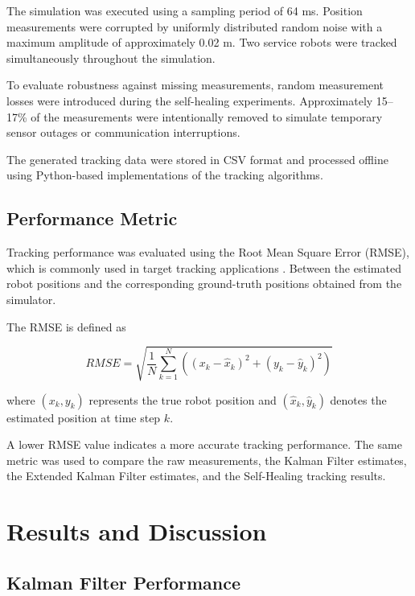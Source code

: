 \documentclass[conference]{IEEEtran}
\begin{document}
The simulation was executed using a sampling period of 64 ms. Position measurements were corrupted by uniformly distributed random noise with a maximum amplitude of approximately 0.02 m. Two service robots were tracked simultaneously throughout the simulation.

To evaluate robustness against missing measurements, random measurement losses were introduced during the self-healing experiments. Approximately 15--17\% of the measurements were intentionally removed to simulate temporary sensor outages or communication interruptions.

The generated tracking data were stored in CSV format and processed offline using Python-based implementations of the tracking algorithms.

\subsection{Performance Metric}

Tracking performance was evaluated using the Root Mean Square Error (RMSE), which is commonly used in target tracking applications \cite{tracking}. Between the estimated robot positions and the corresponding ground-truth positions obtained from the simulator.

The RMSE is defined as

\begin{equation}
RMSE =
\sqrt{
\frac{1}{N}
\sum_{k=1}^{N}
\left(
(x_k-\hat{x}_k)^2
+
(y_k-\hat{y}_k)^2
\right)
}
\end{equation}

where $(x_k,y_k)$ represents the true robot position and $(\hat{x}_k,\hat{y}_k)$ denotes the estimated position at time step $k$.

A lower RMSE value indicates a more accurate tracking performance. The same metric was used to compare the raw measurements, the Kalman Filter estimates, the Extended Kalman Filter estimates, and the Self-Healing tracking results. 



\section{Results and Discussion}

\subsection{Kalman Filter Performance}
\end{document}
